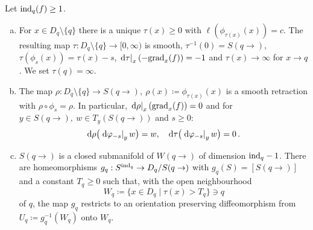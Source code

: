 \begin{lemma}\label{lem:morseFilt-flowTimeAndProjectionToLevelSets}
	Let $\mathrm{ind}_q(f)\geq1$.
	\begin{enumerate}[(a)]
		\item For $x\in D_q\setminus \{q\}$ there is a unique $\tau(x)\geq 0$ with $\ell(\phi_{\tau(x)}(x))=c$. The resulting map $\tau:D_q\setminus \{q\}\to [0,\infty)$ is smooth, $\tau^{-1}(0)=S(q\to)$, $\tau(\phi_s(x))=\tau(x)-s$, $\left.\mathop{}\!\mathrm{d} \tau\right|_{x}(-\mathrm{grad}_x(f))=-1$ and $\tau(x)\to \infty$ for $x\to q$. We set $\tau(q)=\infty$. 
		\item The map $\rho: D_q\setminus \{q\}\to S(q\to),~\rho(x)\coloneq \phi_{\tau(x)}(x)$ is a smooth retraction with $\rho\circ \phi_s=\rho$. In particular, $\left.\mathop{}\!\mathrm{d} \rho\right|_{x}(\mathrm{grad}_x(f))=0$ and for $y\in S(q\to),~w\in T_y(S(q\to))$ and $s\geq 0$:
		 \begin{equation*}
			\mathop{}\!\mathrm{d} \rho \big(\left.\mathop{}\!\mathrm{d} \varphi_{-s}\right|_{y}w\big)=w,\quad \mathop{}\!\mathrm{d} \tau \big(\left.\mathop{}\!\mathrm{d} \varphi_{-s}\right|_{y}w\big)=0\,.
		\end{equation*}
		\item $S(q\to)$ is a closed submanifold of $W(q\to)$ of dimension $\mathrm{ind}_q-1$. There are homeomorphisms $g_q:S^{\mathrm{ind}_q} \to D_q /S(q\to) $ with $g_q(S)=[S(q\to)]$ and a constant $T_q\geq 0$ such that, with the open neighbourhood 
		\begin{equation*}
			W_q\coloneq \{x\in D_q \mid \tau(x)>T_q\}\ni q
		\end{equation*} of $q$, the map $g_q$ restricts to an orientation preserving diffeomorphism from $U_q\coloneq g_q^{-1}(W_q)$ onto $W_q$. 
	\end{enumerate}
\end{lemma}

